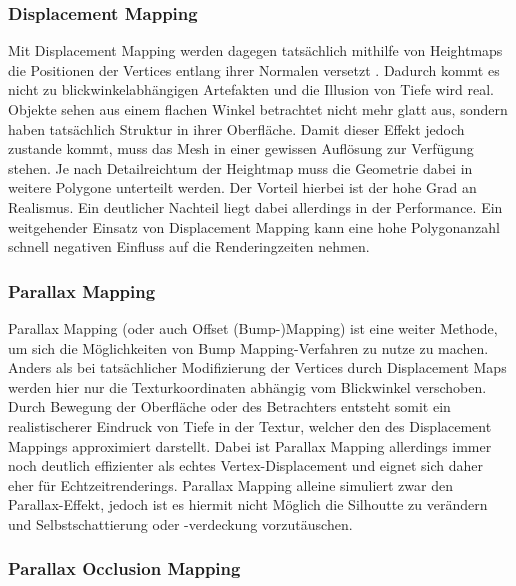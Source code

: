 \subsubsection{Displacement Mapping}
Mit Displacement Mapping werden dagegen tatsächlich mithilfe von Heightmaps die Positionen
der Vertices entlang ihrer Normalen versetzt \parencite{Cook1984,Cook1987}. Dadurch kommt es nicht zu blickwinkelabhängigen Artefakten
und die Illusion von Tiefe wird real. Objekte sehen aus einem flachen Winkel betrachtet nicht mehr
glatt aus, sondern haben tatsächlich Struktur in ihrer Oberfläche. Damit dieser Effekt jedoch zustande kommt,
muss das Mesh in einer gewissen Auflösung zur Verfügung stehen. Je nach Detailreichtum der Heightmap
muss die Geometrie dabei in weitere Polygone unterteilt werden. Der Vorteil hierbei ist der hohe
Grad an Realismus. Ein deutlicher Nachteil liegt dabei allerdings in der Performance.
Ein weitgehender Einsatz von Displacement Mapping kann eine hohe Polygonanzahl schnell
negativen Einfluss auf die Renderingzeiten nehmen. 


\subsubsection{Parallax Mapping}

Parallax Mapping (oder auch Offset (Bump-)Mapping) ist eine weiter Methode, um sich die Möglichkeiten von
Bump Mapping-Verfahren zu nutze zu machen. Anders als bei tatsächlicher Modifizierung der Vertices
durch Displacement Maps werden hier nur die Texturkoordinaten abhängig vom Blickwinkel verschoben. \parencite{Kaneko2001, Welsh2004}
Durch Bewegung der Oberfläche oder des Betrachters entsteht somit ein realistischerer Eindruck
von Tiefe in der Textur, welcher den des Displacement Mappings approximiert darstellt.
Dabei ist Parallax Mapping allerdings immer noch deutlich effizienter als echtes Vertex-Displacement
und eignet sich daher eher für Echtzeitrenderings.
Parallax Mapping alleine simuliert zwar den Parallax-Effekt, jedoch ist es hiermit nicht Möglich die Silhoutte zu verändern und
Selbstschattierung oder -verdeckung vorzutäuschen.


\subsubsection{Parallax Occlusion Mapping}
\label{sec:3.3.4}

